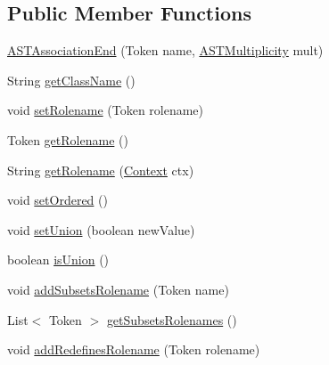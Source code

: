 \subsection*{Public Member Functions}
\begin{DoxyCompactItemize}
\item 
\hyperlink{classorg_1_1tzi_1_1use_1_1parser_1_1use_1_1_a_s_t_association_end_a8f6dda87d7dd8d08244e94cd72aa3b65}{A\-S\-T\-Association\-End} (Token name, \hyperlink{classorg_1_1tzi_1_1use_1_1parser_1_1use_1_1_a_s_t_multiplicity}{A\-S\-T\-Multiplicity} mult)
\item 
String \hyperlink{classorg_1_1tzi_1_1use_1_1parser_1_1use_1_1_a_s_t_association_end_a19536b0324ff4a0378c92fd5e44f57b5}{get\-Class\-Name} ()
\item 
void \hyperlink{classorg_1_1tzi_1_1use_1_1parser_1_1use_1_1_a_s_t_association_end_a57870aace68ff6ae43ebdc181d030867}{set\-Rolename} (Token rolename)
\item 
Token \hyperlink{classorg_1_1tzi_1_1use_1_1parser_1_1use_1_1_a_s_t_association_end_a9aae3e7df9d53a4ac45a3ae80c952e02}{get\-Rolename} ()
\item 
String \hyperlink{classorg_1_1tzi_1_1use_1_1parser_1_1use_1_1_a_s_t_association_end_afc609e38085bdb1bdc2b6620e4effe3d}{get\-Rolename} (\hyperlink{classorg_1_1tzi_1_1use_1_1parser_1_1_context}{Context} ctx)
\item 
void \hyperlink{classorg_1_1tzi_1_1use_1_1parser_1_1use_1_1_a_s_t_association_end_a0c1f4e4dfa1df060aa97c6e4d0e820db}{set\-Ordered} ()
\item 
void \hyperlink{classorg_1_1tzi_1_1use_1_1parser_1_1use_1_1_a_s_t_association_end_a50acdac988d7bb62bc61680e2e6d9b02}{set\-Union} (boolean new\-Value)
\item 
boolean \hyperlink{classorg_1_1tzi_1_1use_1_1parser_1_1use_1_1_a_s_t_association_end_a895f294ce126607bfad8baf69a04c997}{is\-Union} ()
\item 
void \hyperlink{classorg_1_1tzi_1_1use_1_1parser_1_1use_1_1_a_s_t_association_end_ae86f3009a533e044e0d3a5baee723b26}{add\-Subsets\-Rolename} (Token name)
\item 
List$<$ Token $>$ \hyperlink{classorg_1_1tzi_1_1use_1_1parser_1_1use_1_1_a_s_t_association_end_a601ee1d1673d82a19c4e46f7497745fa}{get\-Subsets\-Rolenames} ()
\item 
void \hyperlink{classorg_1_1tzi_1_1use_1_1parser_1_1use_1_1_a_s_t_association_end_ad1fea5c925c0461fd1fe83ec55d0908e}{add\-Redefines\-Rolename} (Token rolename)
\item 

\end{DoxyCompactItemize}
